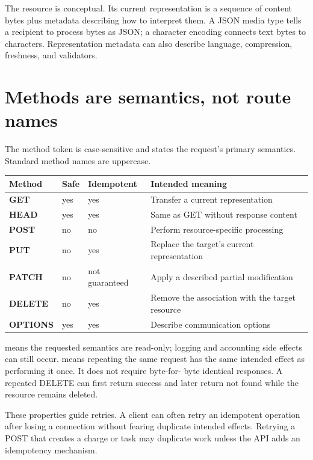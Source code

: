 The resource is conceptual. Its current representation is a sequence of content
bytes plus metadata describing how to interpret them. A JSON media type tells a
recipient to process bytes as JSON; a character encoding connects text bytes to
characters. Representation metadata can also describe language, compression,
freshness, and validators.

\section{Methods are semantics, not route names}

The method token is case-sensitive and states the request's primary semantics.
Standard method names are uppercase.

\begin{center}
\begin{tabularx}{\textwidth}{@{}>{\bfseries}p{20mm} p{23mm} p{25mm} X@{}}
\toprule
Method & Safe & Idempotent & Intended meaning \\
\midrule
GET & yes & yes & Transfer a current representation \\
HEAD & yes & yes & Same as GET without response content \\
POST & no & no & Perform resource-specific processing \\
PUT & no & yes & Replace the target's current representation \\
PATCH & no & not guaranteed & Apply a described partial modification \\
DELETE & no & yes & Remove the association with the target resource \\
OPTIONS & yes & yes & Describe communication options \\
\bottomrule
\end{tabularx}
\end{center}

 means the requested semantics are read-only; logging and accounting
side effects can still occur.  means repeating the same request
has the same intended effect as performing it once. It does not require byte-for-
byte identical responses. A repeated DELETE can first return success and later
return not found while the resource remains deleted.

These properties guide retries. A client can often retry an idempotent operation
after losing a connection without fearing duplicate intended effects. Retrying a
POST that creates a charge or task may duplicate work unless the API adds an
idempotency mechanism.

